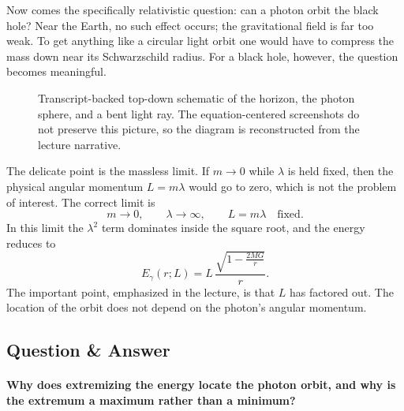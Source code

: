 Now comes the specifically relativistic question: can a photon orbit the black hole? Near the Earth, no such effect occurs; the gravitational field is far too weak. To get anything like a circular light orbit one would have to compress the mass down near its Schwarzschild radius. For a black hole, however, the question becomes meaningful.

\begin{figure}[h]
\centering
{}
\caption{Transcript-backed top-down schematic of the horizon, the photon sphere, and a bent light ray. The equation-centered screenshots do not preserve this picture, so the diagram is reconstructed from the lecture narrative.}
\end{figure}

The delicate point is the massless limit. If \(m\to 0\) while \(\lambda\) is held fixed, then the physical angular momentum \(L=m\lambda\) would go to zero, which is not the problem of interest. The correct limit is
\begin{equation}
m\to 0,
\qquad
\lambda\to\infty,
\qquad
L=m\lambda
\quad \text{fixed}.
\end{equation}
In this limit the \(\lambda^{2}\) term dominates inside the square root, and the energy reduces to
\begin{equation}
E_{\gamma}(r;L)
=
L\,\frac{\sqrt{1-\frac{2MG}{r}}}{r}.
\end{equation}
The important point, emphasized in the lecture, is that \(L\) has factored out. The location of the orbit does not depend on the photon's angular momentum.

\subsection{Question \& Answer}

\paragraph{Why does extremizing the energy locate the photon orbit, and why is the extremum a maximum rather than a minimum?}

